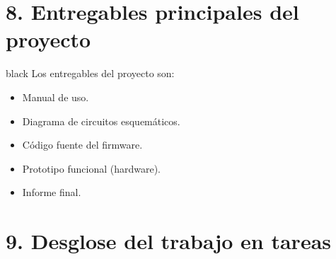 \documentclass[
11pt, %
codirector, %
]{charter}
\begin{document}
\section{8. Entregables principales del proyecto}
\label{sec:entregables}

\begin{consigna}{black}
Los entregables del proyecto son:

\begin{itemize}
	\item Manual de uso.
	\item Diagrama de circuitos esquemáticos.
	\item Código fuente del firmware.
	\item Prototipo funcional (hardware).
	\item Informe final.
\end{itemize}

\end{consigna}

\section{9. Desglose del trabajo en tareas}
\label{sec:wbs}
\end{document}
